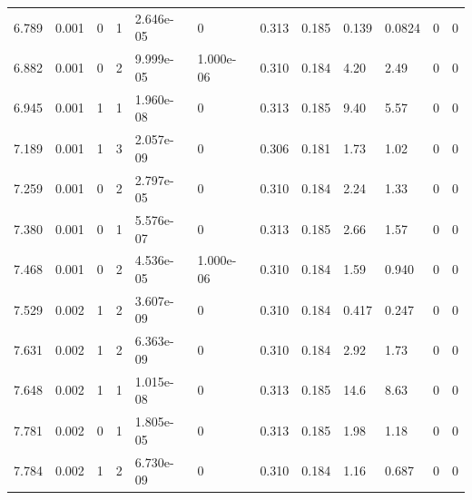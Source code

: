 \documentclass[preview]{standalone}
\begin{document}
{{{\begin{tabular}{L{1.2cm}C{1.2cm} C{0.3cm}C{0.5cm} C{1.4cm}C{1.4cm} C{1.4cm}C{1.4cm} C{1.6cm}C{1.6cm} C{1.6cm}C{1.6cm}}
  6.789  &  0.001  & 0     &  1 &  2.646e-05  & 0  &  0.313&   0.185& 0.139 & 0.0824   &  0 & 0  \\ 
  6.882  &  0.001  & 0     &  2 &  9.999e-05  & 1.000e-06  &  0.310&   0.184& 4.20 & 2.49   &  0 & 0  \\ 
  6.945  &  0.001  & 1     &  1 &  1.960e-08  & 0  &  0.313&   0.185& 9.40 & 5.57   &  0 & 0  \\ 
  7.189  &  0.001  & 1     &  3 &  2.057e-09  & 0  &  0.306&   0.181& 1.73 & 1.02   &  0 & 0  \\ 
  7.259  &  0.001  & 0     &  2 &  2.797e-05  & 0  &  0.310&   0.184& 2.24 & 1.33   &  0 & 0  \\ 
  7.380  &  0.001  & 0     &  1 &  5.576e-07  & 0  &  0.313&   0.185& 2.66 & 1.57   &  0 & 0  \\ 
  7.468  &  0.001  & 0     &  2 &  4.536e-05  & 1.000e-06  &  0.310&   0.184& 1.59 & 0.940   &  0 & 0  \\ 
  7.529  &  0.002  & 1     &  2 &  3.607e-09  & 0  &  0.310&   0.184& 0.417 & 0.247   &  0 & 0  \\ 
  7.631  &  0.002  & 1     &  2 &  6.363e-09  & 0  &  0.310&   0.184& 2.92 & 1.73   &  0 & 0  \\ 
  7.648  &  0.002  & 1     &  1 &  1.015e-08  & 0  &  0.313&   0.185& 14.6 & 8.63   &  0 & 0  \\ 
  7.781  &  0.002  & 0     &  1 &  1.805e-05  & 0  &  0.313&   0.185& 1.98 & 1.18   &  0 & 0  \\ 
  7.784  &  0.002  & 1     &  2 &  6.730e-09  & 0  &  0.310&   0.184& 1.16 & 0.687   &  0 & 0  \\ 
\hline 
\end{tabular} 

}}}
\end{document}
